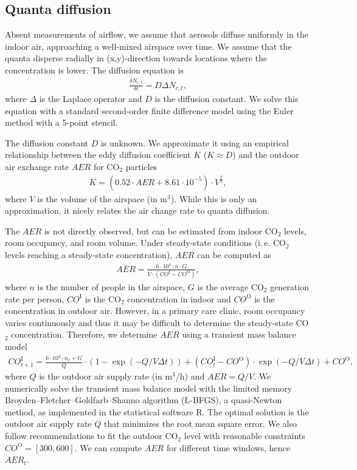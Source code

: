 \documentclass[fleqn,11pt]{wlscirep_supp}
\newcommand\ie{i.\,e.\xspace}
\begin{document}
\subsection{Quanta diffusion}\label{sec:quanta-diffusion}

Absent measurements of airflow, we assume that aerosols diffuse uniformly in the indoor air, approaching a well-mixed airspace over time. We assume that the quanta disperse radially in (x,y)-direction towards locations where the concentration is lower. The diffusion equation is 
\begin{align}\label{eq:diffusion}
    \frac{\delta N_{c,t}}{\delta t} = D \Delta N_{c,t},
\end{align}
where $\Delta$ is the Laplace operator and $D$ is the diffusion constant. We solve this equation with a standard second-order finite difference model using the Euler method with a 5-point stencil. 

The diffusion constant $D$ is unknown. We approximate it using an empirical relationship between the eddy diffusion coefficient $K$ ($K \approx D$) and the outdoor air exchange rate $AER$ for CO$_2$ particles\cite{Cheng2011EnvSciTech,Foat2020BE}
\begin{align}
    K = (0.52 \cdot AER + 8.61\cdot10^{-5}) \cdot V^{\frac{2}{3}},
\end{align}
where $V$ is the volume of the airspace (in m$^3$). While this is only an approximation, it nicely relates the air change rate to quanta diffusion.

The $AER$ is not directly observed, but can be estimated from indoor CO$_2$ levels, room occupancy, and room volume. Under steady-state conditions (\ie CO$_2$ levels reaching a steady-state concentration), $AER$ can be computed as
\begin{align}
    AER = \frac{6\cdot10^4 \cdot n \cdot G}{V\cdot(CO^{\text{I}}-CO^{\text{O}})},
\end{align}
where $n$ is the number of people in the airspace, $G$ is the average CO$_2$ generation rate per person, $CO^{\text{I}}$ is the CO$_2$ concentration in indoor and $CO^{\text{O}}$ is the concentration in outdoor air\cite{Batterman2017IJERPH}. However, in a primary care clinic, room occupancy varies continuously and thus it may be difficult to determine the steady-state CO$_2$ concentration. Therefore, we determine $AER$ using a transient mass balance model\cite{Batterman2017IJERPH}
\begin{align}
    CO_{t+1}^{\text{I}} = \frac{6\cdot10^4 \cdot n_t + G}{Q} \cdot \left(1 - \exp(-Q/V \Delta t)\right) + (CO_t^{\text{I}}-CO^{\text{O}}) \cdot \exp(-Q/V \Delta t) + CO^{\text{O}},
\end{align}
where $Q$ is the outdoor air supply rate (in m$^3$/h) and $AER = Q/V$. We numerically solve the transient mass balance model with the limited memory Broyden–Fletcher–Goldfarb–Shanno algorithm (L-BFGS), a quasi-Newton method, as implemented in the statistical software R\cite{Byrd1995SIAM}. The optimal solution is the outdoor air supply rate $Q$ that minimizes the root mean square error. We also follow recommendations to fit the outdoor CO$_2$ level with reasonable constraints $CO^{\text{O}} = [300,600]$\cite{Batterman2017IJERPH}. We can compute $AER$ for different time windows, hence $AER_t$.
\end{document}
